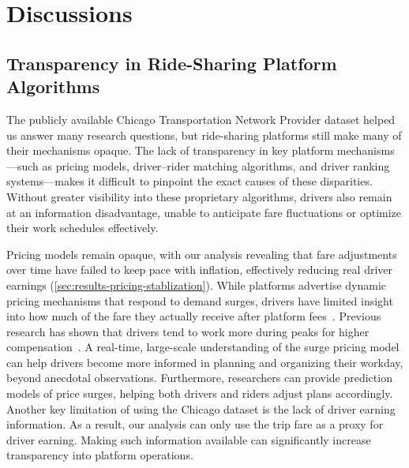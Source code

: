 \section{Discussions}

\subsection{Transparency in Ride-Sharing Platform Algorithms}
The publicly available Chicago Transportation Network Provider dataset helped us answer many research questions, but ride-sharing platforms still make many of their mechanisms opaque. The lack of transparency in key platform mechanisms---such as pricing models, driver--rider matching algorithms, and driver ranking systems---makes it difficult to pinpoint the exact causes of these disparities. Without greater visibility into these proprietary algorithms, drivers also remain at an information disadvantage, unable to anticipate fare fluctuations or optimize their work schedules effectively.

Pricing models remain opaque, with our analysis revealing that fare adjustments over time have failed to keep pace with inflation, effectively reducing real driver earnings (\cref{sec:results-pricing-stablization}). While platforms advertise dynamic pricing mechanisms that respond to demand surges, drivers have limited insight into how much of the fare they actually receive after platform fees~\cite{santos2020dynamic}. Previous research has shown that drivers tend to work more during peaks for higher compensation~\cite{chen2016dynamic}. A real-time, large-scale understanding of the surge pricing model can help drivers become more informed in planning and organizing their workday, beyond anecdotal observations. Furthermore, researchers can provide prediction models of price surges, helping both drivers and riders adjust plans accordingly. Another key limitation of using the Chicago dataset is the lack of driver earning information. As a result, our analysis can only use the trip fare as a proxy for driver earning. Making such information available can significantly increase transparency into platform operations.

